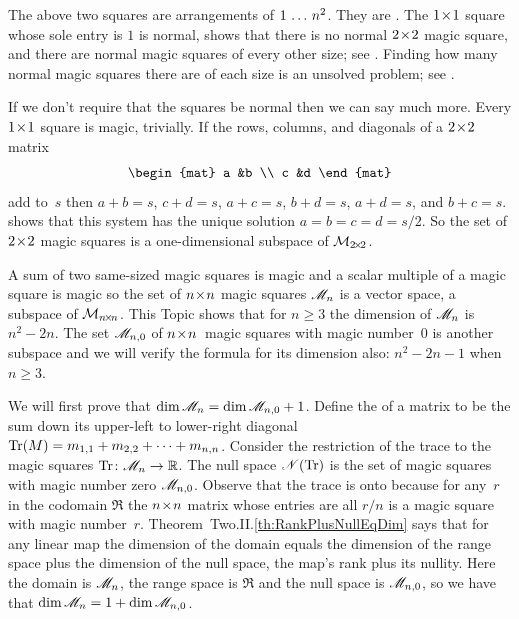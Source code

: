 The above two squares are arrangements of $1\,\ldots\, n^2$.
They are .
The $1 \! \times \! 1$ square whose sole entry is $1$ is normal, 
 shows that there is
no normal $2 \! \times \! 2$ magic square,
and there are normal magic squares of every other size; 
see \cite{WikipediaMagicSquare}.
Finding how many normal magic squares there are of each size is an unsolved
problem;
see \cite{OnlineEncyclopedia}.
 
If we don't require that the squares be normal then we can say much more.
Every $1 \! \times \! 1$ square is magic, trivially.
If the rows, columns, and diagonals of a $2 \! \times \! 2$ matrix 
\begin{equation*}
  \begin{mat}
    a  &b  \\
    c  &d
  \end{mat}
\end{equation*}
add to~$s$
then $a+b=s$, $c+d=s$, $a+c=s$, $b+d=s$, $a+d=s$, and $b+c=s$.
 shows that this
system has the unique solution $a=b=c=d=s/2$.
So the set of $2 \! \times \! 2$ magic squares
is a one-dimensional subspace of $\mathcal{M}_{2 \! \times \! 2}$.

A sum of two same-sized magic squares is magic and a 
scalar multiple of a magic square is magic so the set of 
$n \! \times \! n$ magic squares
$\mathscr{M}_n$ is a vector space, a subspace of $\mathcal{M}_{n \! \times \! n}$.
This Topic shows that for $n\geq 3$ the 
dimension of
$\mathscr{M}_n$ is $n^2-2n$.
The set $\mathscr{M}_{n,0}$ of $n \! \times \! n$~magic squares with magic number~$0$ 
is another subspace and we will verify the formula for its dimension also:
$n^2-2n-1$ when $n\geq 3$.

We will first prove that $\dim\mathscr{M}_n=\dim\mathscr{M}_{n,0}+1$.
Define the 
 of a matrix to be
the sum down its upper-left to lower-right diagonal
$\operatorname{Tr} (M)=m_{1,1}+m_{2,2}+\cdots+m_{n,n}$.
Consider the restriction of the trace to the magic squares
$\mbox{$\operatorname{Tr}\colon \mathscr{M}_n\to \mathbb{R}$}$. 
The null space $\mathscr{N}(\operatorname{Tr})$ is the set of magic squares with magic
number zero 
$\mathscr{M}_{n,0}$.
Observe that the trace is onto because for any~$r$ in the 
codomain $\Re$ the $n \! \times \! n$ matrix whose entries are all $r/n$ is
a magic square with magic number~$r$.
Theorem~Two.II.\ref{th:RankPlusNullEqDim} says that for any linear map the
dimension of the domain equals the dimension of the range space 
plus the dimension of the null space,
the map's rank plus its nullity.
Here the domain is $\mathscr{M}_n$, the range space is 
$\Re$ and the null space is $\mathscr{M}_{n,0}$,
so we have that $\dim\mathscr{M}_n=1+\dim\mathscr{M}_{n,0}$.

